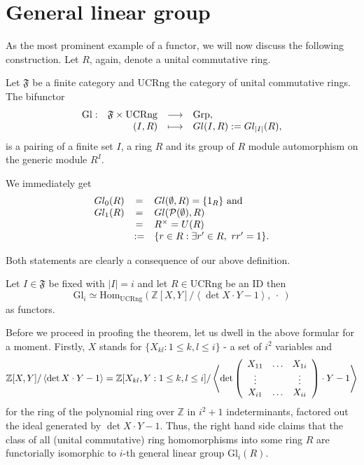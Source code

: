 \section{General linear group}

As the most prominent example of a functor, we will now discuss the following construction. Let $R$, again, denote a unital commutative ring.
\begin{defi}
Let $\mathfrak{F}$ be a finite category and $\mathrm{UCRng}$ the category of unital commutative rings. The bifunctor
$$\bao{rrcl}
\mathrm{Gl} : &\mathfrak{F} \times \mathrm{UCRng} &\longrightarrow &\mathrm{Grp},\\
& (I,R) &\longmapsto& Gl(I,R) := Gl_{|I|}(R),\\
\ea$$
is a pairing of a finite set $I$, a ring $R$ and its group of $R$ module automorphism on the generic module $R^I$.
\end{defi}
\begin{coro}
We  immediately get
$$\bao{rcl}
Gl_0(R) &=& Gl(\emptyset,R) = \{1_R\} \ \mathrm{and}\\
Gl_1(R) &=& Gl(\mathcal{P}(\emptyset),R)\\ &=& R^\times = U(R)\\ &:=& \{r \in R : \exists r' \in R,\ r r' = 1\}.\\
\ea\\$$
\end{coro}
Both statements are clearly a consequence of our above definition.
\begin{theo}
Let $I \in \mathfrak{F}$ be fixed with $|I| = i$ and let $R \in \mathrm{UCRng}$ be an ID then
$$\mathrm{Gl}_i \simeq \mathrm{Hom}_{\mathrm{UCRng}}(\mathbb{Z}[X,Y]/\left<\det X \cdot Y - 1\right>,\ \cdot\ )$$
as functors.
\end{theo}
Before we proceed in proofing the theorem, let us dwell in the above formular for a moment. Firstly, $X$ stands for $\{X_{kl} : 1 \leq k, l \leq i\}$ - a set of $i^2$ variables and
$$\mathbb{Z}[X,Y]/\left<\det X \cdot Y - 1\right> = \mathbb{Z}[X_{kl},Y : 1 \leq k, l \leq i]/\left<\det \left(\bao{ccc}
X_{11} & \ldots & X_{1i}\\
\vdots&&\vdots\\
X_{i1}&\ldots&X_{ii}\ea\right) \cdot Y - 1\right>$$
for the ring of the polynomial ring over $\mathbb{Z}$ in $i^2 + 1$ indeterminants, factored out the ideal generated by $\det X \cdot Y - 1$. Thus, the right hand side claims that the class of all (unital commutative) ring homomorphisms into some ring $R$ are functorially isomorphic to $i$-th general linear group $\mathrm{Gl}_i(R)$. %

